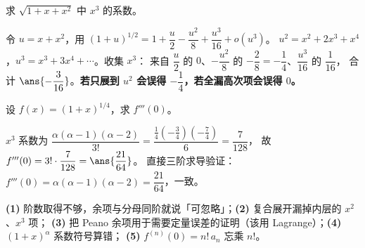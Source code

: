 \documentclass[11pt,a4paper]{ctexart}
\begin{document}
\begin{exa}[复合展开别漏高次项]
求 $\sqrt{1+x+x^2}$ 中 $x^3$ 的系数。
\end{exa}
\begin{solution}
令 $u=x+x^2$，用 $(1+u)^{1/2}=1+\dfrac u2-\dfrac{u^2}{8}+\dfrac{u^3}{16}+o(u^3)$。
$u^2=x^2+2x^3+x^4$，$u^3=x^3+3x^4+\cdots$。收集 $x^3$：
来自 $\dfrac u2$ 的 $0$、$-\dfrac{u^2}{8}$ 的 $-\dfrac{2}{8}=-\dfrac14$、$\dfrac{u^3}{16}$ 的 $\dfrac1{16}$，
合计 $\ans{-\dfrac3{16}}$。\textbf{若只展到 $u^2$ 会误得 $-\dfrac14$，若全漏高次项会误得 $0$。}
\end{solution}

\begin{exa}[用系数求高阶导]
设 $f(x)=(1+x)^{1/4}$，求 $f'''(0)$。
\end{exa}
\begin{solution}
$x^3$ 系数为 $\dfrac{\alpha(\alpha-1)(\alpha-2)}{3!}=\dfrac{\frac14\left(-\frac34\right)\left(-\frac74\right)}{6}=\dfrac{7}{128}$，
故 $f'''(0)=3!\cdot\dfrac7{128}=\ans{\dfrac{21}{64}}$。
直接三阶求导验证：$f'''(0)=\alpha(\alpha-1)(\alpha-2)=\dfrac{21}{64}$，一致。
\end{solution}

\begin{warnbox}[泰勒章的失分点]
\textbf{(1)} 阶数取得不够，余项与分母同阶就说「可忽略」；\textbf{(2)} 复合展开漏掉内层的 $x^2$、$x^3$ 项；
\textbf{(3)} 把 Peano 余项用于需要定量误差的证明（该用 Lagrange）；\textbf{(4)} $(1+x)^\alpha$ 系数符号算错；
\textbf{(5)} $f^{(n)}(0)=n!\,a_n$ 忘乘 $n!$。
\end{warnbox}
\end{document}
